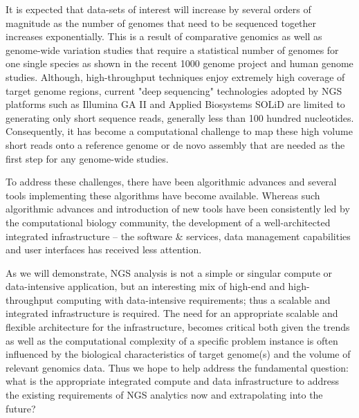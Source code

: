 \documentclass{cpeauth}
\begin{document}
It is expected that data-sets of interest will increase by several
orders of magnitude as the number of genomes that need to be sequenced
together increases exponentially.  This is a result of comparative
genomics as well as genome-wide variation studies that require a
statistical number of genomes for one single species as shown in the
recent 1000 genome project and human genome
studies\cite{1000genome,mardis2008-tig,gilad2009,alex2009,kim2011}.
Although, high-throughput techniques enjoy extremely high coverage of
target genome regions, current "deep sequencing" technologies adopted
by NGS platforms such as Illumina GA II and Applied Biosystems SOLiD
are limited to generating only short sequence reads, generally less
than 100 hundred nucleotides\cite{metzker2010}. Consequently, it has
become a computational challenge to map these high volume short reads
onto a reference genome or de novo assembly that are needed as the
first step for any genome-wide
studies\cite{alex2009,trapnell2009,scheibye-alsing2009,pop2002,hernandez2008,farrer2008}.


To address these challenges, there have been algorithmic advances and
several tools implementing these algorithms have become
available\cite{trapnell2009,bfast2009,scheibye-alsing2009,pepke2009,samtools}.
Whereas such algorithmic advances and introduction of new tools have
been consistently led by the computational biology community, the
development of a well-architected integrated infrastructure -- the
software \& services, data management capabilities and user interfaces
has received less attention.

As we will demonstrate, NGS analysis is not a simple or singular
compute or data-intensive application, but an interesting mix of
high-end and high-throughput computing with data-intensive
requirements; thus a scalable and integrated infrastructure is
required.  The need for an appropriate scalable and flexible
architecture for the infrastructure, becomes critical both given the
trends as well as the computational complexity of a specific problem
instance is often influenced by the biological characteristics of
target genome(s) and the volume of relevant genomics data.  Thus we
hope to help address the fundamental question: what is the appropriate
integrated compute and data infrastructure to address the existing
requirements of NGS analytics now and extrapolating into the future?
\end{document}
